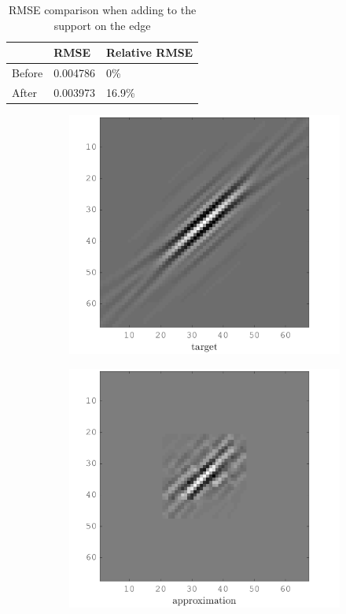 \begin{table}[!h]\centering
\begin{tabular}{@{}lll@{}}\toprule
 & RMSE & Relative RMSE \\ \midrule
Before & 0.004786 & 0\% \\
After & 0.003973 & 16.9\% \\ \bottomrule
\end{tabular}
\caption{RMSE comparison when adding to the support on the  edge}
\end{table}


\begin{figure}[!h]\centering
    \begin{subfigure}[b]{0.49\textwidth}\centering
    \includegraphics[width=\textwidth]{figures/xp/xp_128x128_sc2_angl1_K3_S3_node4_target.png}
    \end{subfigure}
\begin{subfigure}[b]{0.49\textwidth}\centering
\includegraphics[width=\textwidth]{figures/xp/xp_128x128_sc2_angl1_K3_S3_node4_approx.png}

\end{subfigure}
\end{figure}
